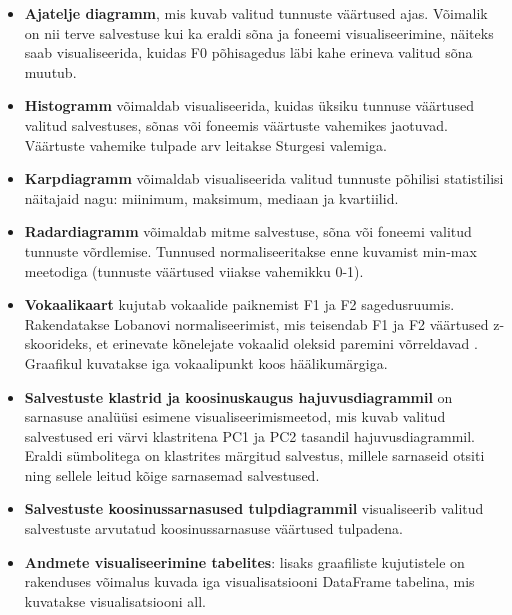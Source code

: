 \begin{itemize}
    \item \textbf{Ajatelje diagramm}, mis kuvab valitud tunnuste väärtused ajas. Võimalik on nii terve salvestuse kui ka eraldi sõna ja foneemi visualiseerimine, näiteks saab visualiseerida, kuidas F0 põhisagedus läbi kahe erineva valitud sõna muutub.
    
    \item \textbf{Histogramm} võimaldab visualiseerida, kuidas üksiku tunnuse väärtused valitud salvestuses, sõnas või foneemis väärtuste vahemikes jaotuvad. Väärtuste vahemike tulpade arv leitakse Sturgesi valemiga.

    \item \textbf{Karpdiagramm} võimaldab visualiseerida valitud tunnuste põhilisi statistilisi näitajaid nagu: miinimum, maksimum, mediaan ja kvartiilid.

    \item \textbf{Radardiagramm} võimaldab mitme salvestuse, sõna või foneemi valitud tunnuste võrdlemise. Tunnused normaliseeritakse enne kuvamist min-max meetodiga (tunnuste väärtused viiakse vahemikku 0-1).

    \item \textbf{Vokaalikaart} kujutab vokaalide paiknemist F1 ja F2 sagedusruumis. Rakendatakse Lobanovi normaliseerimist, mis teisendab F1 ja F2 väärtused z-skoorideks, et erinevate kõnelejate vokaalid oleksid paremini võrreldavad \cite{norm_vowel_normalization}. Graafikul kuvatakse iga vokaalipunkt koos häälikumärgiga.

    \item \textbf{Salvestuste klastrid ja koosinuskaugus hajuvusdiagrammil} on sarnasuse analüüsi esimene visualiseerimismeetod, mis kuvab valitud salvestused eri värvi klastritena PC1 ja PC2 tasandil hajuvusdiagrammil. Eraldi sümbolitega on klastrites märgitud salvestus, millele sarnaseid otsiti ning sellele leitud kõige sarnasemad salvestused.

    \item \textbf{Salvestuste koosinussarnasused tulpdiagrammil} visualiseerib valitud salvestuste arvutatud koosinussarnasuse väärtused tulpadena.

    \item \textbf{Andmete visualiseerimine tabelites}: lisaks graafiliste kujutistele on rakenduses võimalus kuvada iga visualisatsiooni DataFrame tabelina, mis kuvatakse visualisatsiooni all.
\end{itemize}

